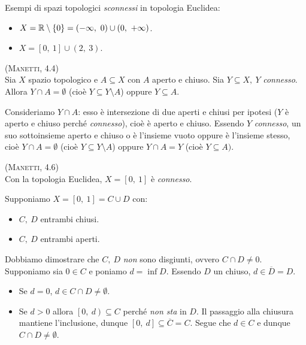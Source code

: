 \begin{examples} Esempi di spazi topologici \textit{sconnessi} in topologia Euclidea:
	\begin{itemize}
		\item $X=\realset\setminus\left\{0\right\}=\left(-\infty,\ 0\right)\cup \left(0,\ +\infty\right)$.
		\item $X=\left[0,\ 1\right]\cup \left(2,\ 3\right)$.
	\end{itemize}
\vspace{-3mm}
\end{examples}
\begin{lemming}\textsc{(Manetti, 4.4)}\\
Sia $X$ spazio topologico e $A\subseteq X$ con $A$ aperto e chiuso. Sia $Y\subseteq X,\ Y$ \textit{connesso}. Allora $Y\cap A=\emptyset$ (cioè $Y\subseteq Y\setminus A$) oppure $Y\subseteq A$. 
\end{lemming}
\begin{demonstration}
Consideriamo $Y\cap A$: esso è intersezione di due aperti e chiusi per ipotesi ($Y$ è aperto e chiuso perché \textit{connesso}), cioè è aperto e chiuso. Essendo $Y$ \textit{connesso}, un suo sottoinsieme aperto e chiuso o è l'insieme vuoto oppure è l'insieme stesso, cioè $Y\cap A=\emptyset$ (cioè $Y\subseteq Y\setminus A$) oppure $Y\cap A=Y$ (cioè $Y\subseteq A)$.
\end{demonstration}
\begin{theorema}\textsc{(Manetti, 4.6)}\\
Con la topologia Euclidea, $X=\left[0,\ 1\right]$ è \textit{connesso}.
\end{theorema}
\begin{demonstration}
Supponiamo $X=\left[0,\ 1\right]=C\cup D$ con:
\begin{itemize}
	\item $C,\ D$ entrambi chiusi.
	\item $C,\ D$ entrambi aperti.
\end{itemize}
Dobbiamo dimostrare che $C,\ D$ \textit{non} sono disgiunti, ovvero $C\cap D\neq 0$. Supponiamo sia $0\in C$ e poniamo $d=\inf D$. Essendo $D$ un chiuso, $d\in \overline{D}=D$.
\begin{itemize}
	\item Se $d=0$, $d\in C\cap D\neq \emptyset$.
	\item Se $d>0$ allora $\left[0,\ d\right)\subseteq C$ perché \textit{non sta} in $D$. Il passaggio alla chiusura mantiene l'inclusione, dunque $\left[0,\ d\right]\subseteq \overline{C}=C$. Segue che $d\in C$ e dunque $C\cap D\neq \emptyset$.
\end{itemize}
\vspace{-3mm}
\end{demonstration}
